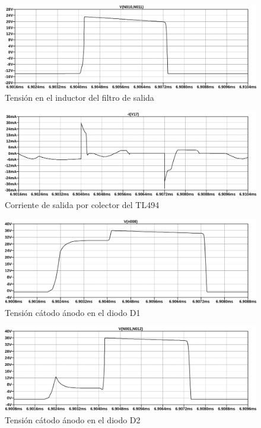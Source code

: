 \begin{figure}[ht]
    \centering
    \includegraphics[width=\textwidth]{images/sim/22.pdf}
    \caption{Tensión en el inductor del filtro de salida}
    \label{fig:sim:22}
\end{figure}

\begin{figure}[ht]
    \centering
    \includegraphics[width=\textwidth]{images/sim/23.pdf}
    \caption{Corriente de salida por colector del TL494}
    \label{fig:sim:23}
\end{figure}

\begin{figure}[ht]
    \centering
    \includegraphics[width=\textwidth]{images/sim/24.pdf}
    \caption{Tensión cátodo ánodo en el diodo D1}
    \label{fig:sim:24}
\end{figure}

\begin{figure}[ht]
    \centering
    \includegraphics[width=\textwidth]{images/sim/25.pdf}
    \caption{Tensión cátodo ánodo en el diodo D2}
    \label{fig:sim:25}
\end{figure}

